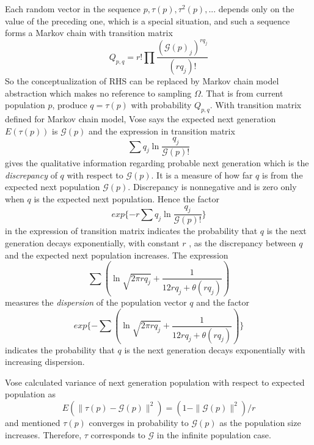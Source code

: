 Each random vector in the sequence $p, \tau(p), \tau^2(p),...$ depends only on the value of the preceding one, which is a special situation, and such a sequence forms a Markov chain with
transition matrix
\[
Q_{p,q} = r! \prod \frac{(\mathcal{G}(p)_j)^{rq_j}}{(rq_j)!}
\]
So the conceptualization of RHS can be replaced by Markov chain model abstraction which makes no reference to sampling $\Omega$. That is from current population $p$, produce $q = \tau (p)$ with probability $Q_{p,q}$. With transition matrix defined for Markov chain model, Vose \cite{Vose1999} says the expected next generation $E(\tau (p))$ is $\mathcal{G}(p)$ and the expression in transition matrix
\[
\sum q_j \ln \frac{q_j}{\mathcal{G}(p)!}
\]
gives the qualitative information regarding probable next generation which is the {\em discrepancy} of $q$ with respect to $\mathcal{G}(p)$. It is a measure of how far $q$ is from the expected next population $\mathcal{G}(p)$. Discrepancy is nonnegative and is zero only when $q$ is the expected next population. Hence the factor 
\[
exp\{-r \sum q_j \ln \frac{q_j}{\mathcal{G}(p)!}\}
\]
in the expression of transition matrix indicates the probability that $q$ is the next generation
decays exponentially, with constant $r$ , as the discrepancy between $q$ and the
expected next population increases.
The expression 
\[
\sum (\ln \sqrt{2 \pi rq_j} + \frac{1}{12rq_j + \theta (rq_j)})
\]
measures the {\em dispersion} of the population vector $q$ and the factor
\[
exp\{- \sum (\ln \sqrt{2 \pi rq_j} + \frac{1}{12rq_j + \theta (rq_j)})\}
\]
indicates the probability that $q$ is the next generation decays exponentially with increasing dispersion.

Vose \cite{Vose1999} calculated variance of next generation population with respect to expected population as 
\[
E(\| \tau (p) - \mathcal{G}(p) \|^2) = (1 - \|\mathcal{G}(p)\|^2) / r
\]
and mentioned $\tau (p)$ converges in probability to $\mathcal{G}(p)$ as the population size increases. Therefore, $\tau$ corresponds to $\mathcal{G}$ in the infinite
population case.





